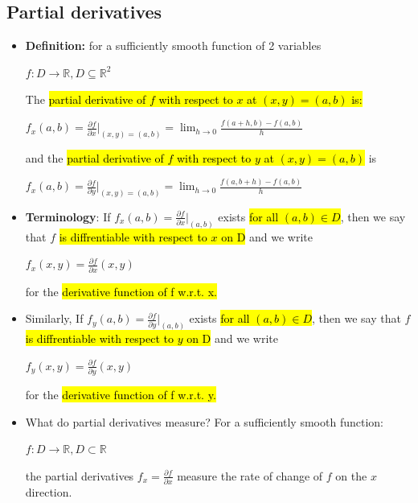 \documentclass{article}
\begin{document}
  \subsection*{Partial derivatives}
  \begin{itemize}
  	\item \textbf{Definition:} for a sufficiently smooth function of 2 variables
  	\begin{center}
  		$f: D \rightarrow \mathbb{R}, D \subseteq \mathbb{R}^2$
  	\end{center}
  	The \hl{partial derivative of $f$ with respect to $x$ at $(x,y) = (a,b)$ is:}
  	\begin{center}
  		$f_x(a, b) = \frac{\partial f}{\partial x}\Bigg|_{(x,y)=(a,b)} = \lim_{h \to 0} \frac{f(a+h,b) - f(a,b)}{h}$
  	\end{center}
  	and the \hl{partial derivative of $f$ with respect to $y$ at $(x,y) = (a,b)$} is 
  	\begin{center}
  		$f_x(a, b) = \frac{\partial f}{\partial y}\Bigg|_{(x,y)=(a,b)} = \lim_{h \to 0} \frac{f(a,b+h) - f(a,b)}{h}$
  	\end{center}

  	\item \textbf{Terminology}: If $f_x(a,b) = \frac{\partial f}{\partial x}\Bigg|_{(a,b)}$ exists \hl{for all $(a,b) \in D$}, then we say that $f$ \hl{is diffrentiable with respect to $x$ on D} and we write
  	\begin{center}
  		$f_x(x,y) = \frac{\partial f}{\partial x}(x,y)$
  	\end{center}
  	for the \hl{derivative function of f w.r.t. x.}

  	\item Similarly, If $f_y(a,b) = \frac{\partial f}{\partial y}\Bigg|_{(a,b)}$ exists \hl{for all $(a,b) \in D$}, then we say that $f$ \hl{is diffrentiable with respect to $y$ on D} and we write
  	\begin{center}
  		$f_y(x,y) = \frac{\partial f}{\partial y}(x,y)$
  	\end{center}
  	for the \hl{derivative function of f w.r.t. y.}

  	\item What do partial derivatives measure? For a sufficiently smooth function:
  	\begin{center}
  		$f: D \rightarrow \mathbb{R}, D \subset \mathbb{R}$
  	\end{center}
  	the partial derivatives $f_x = \frac{\partial f}{\partial x}$ measure the rate of change of $f$ on the $x$ direction. 


\end{itemize}
\end{document}
